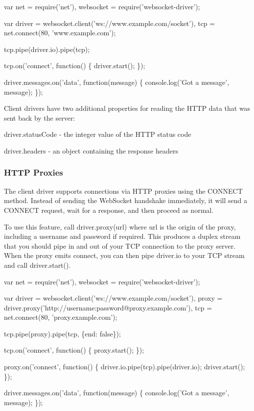 \begin{DoxyCode}
var net = require('net'),
    websocket = require('websocket-driver');

var driver = websocket.client('ws://www.example.com/socket'),
    tcp = net.connect(80, 'www.example.com');

tcp.pipe(driver.io).pipe(tcp);

tcp.on('connect', function() \{
  driver.start();
\});

driver.messages.on('data', function(message) \{
  console.log('Got a message', message);
\});
\end{DoxyCode}


Client drivers have two additional properties for reading the H\+T\+TP data that was sent back by the server\+:


\begin{DoxyItemize}
\item {\ttfamily driver.\+status\+Code} -\/ the integer value of the H\+T\+TP status code
\item {\ttfamily driver.\+headers} -\/ an object containing the response headers
\end{DoxyItemize}

\subsubsection*{H\+T\+TP Proxies}

The client driver supports connections via H\+T\+TP proxies using the {\ttfamily C\+O\+N\+N\+E\+CT} method. Instead of sending the Web\+Socket handshake immediately, it will send a {\ttfamily C\+O\+N\+N\+E\+CT} request, wait for a {} response, and then proceed as normal.

To use this feature, call {\ttfamily driver.\+proxy(url)} where {\ttfamily url} is the origin of the proxy, including a username and password if required. This produces a duplex stream that you should pipe in and out of your T\+CP connection to the proxy server. When the proxy emits {\ttfamily connect}, you can then pipe {\ttfamily driver.\+io} to your T\+CP stream and call {\ttfamily driver.\+start()}.


\begin{DoxyCode}
var net = require('net'),
    websocket = require('websocket-driver');

var driver = websocket.client('ws://www.example.com/socket'),
    proxy  = driver.proxy('http://username:password@proxy.example.com'),
    tcp    = net.connect(80, 'proxy.example.com');

tcp.pipe(proxy).pipe(tcp, \{end: false\});

tcp.on('connect', function() \{
  proxy.start();
\});

proxy.on('connect', function() \{
  driver.io.pipe(tcp).pipe(driver.io);
  driver.start();
\});

driver.messages.on('data', function(message) \{
  console.log('Got a message', message);
\});
\end{DoxyCode}


